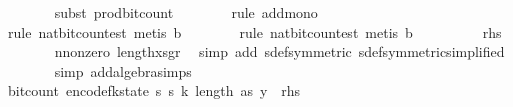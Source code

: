 \begin{isabellebody}
\ \ \ \ \ \ \isamarkupfalse%
\ {\isacharparenleft}{\kern0pt}subst\ prod{\isacharunderscore}{\kern0pt}bit{\isacharunderscore}{\kern0pt}count{\isacharunderscore}{\kern0pt}{}{\isacharparenright}{\kern0pt}\isanewline
\ \ \ \ \ \ \isamarkupfalse%
\ {\isacharparenleft}{\kern0pt}rule\ add{\isacharunderscore}{\kern0pt}mono{\isacharparenright}{\kern0pt}\isanewline
\ \ \ \ \ \ \isamarkupfalse%
\ {\isacharparenleft}{\kern0pt}rule\ nat{\isacharunderscore}{\kern0pt}bit{\isacharunderscore}{\kern0pt}count{\isacharunderscore}{\kern0pt}est{\isacharcomma}{\kern0pt}\ metis\ b{}{\isacharparenright}{\kern0pt}\isanewline
\ \ \ \ \ \ \isamarkupfalse%
\ {\isacharparenleft}{\kern0pt}rule\ nat{\isacharunderscore}{\kern0pt}bit{\isacharunderscore}{\kern0pt}count{\isacharunderscore}{\kern0pt}est{\isacharcomma}{\kern0pt}\ metis\ b{}{\isacharparenright}{\kern0pt}\isanewline
\ \ \ \ \isamarkupfalse%
\ \isamarkupfalse%
\ {\isachardoublequoteopen}{\isachardot}{\kern0pt}{\isachardot}{\kern0pt}{\isachardot}{\kern0pt}\ {\isasymle}\ {\isacharquery}{\kern0pt}rhs{\isachardoublequoteclose}\isanewline
\ \ \ \ \ \ \isamarkupfalse%
\ n{\isacharunderscore}{\kern0pt}nonzero\ length{\isacharunderscore}{\kern0pt}xs{\isacharunderscore}{\kern0pt}gr{\isacharunderscore}{\kern0pt}{}\ \isamarkupfalse%
\ {\isacharparenleft}{\kern0pt}simp\ add{\isacharcolon}{\kern0pt}\ sdef{\isacharbrackleft}{\kern0pt}symmetric{\isacharbrackright}{\kern0pt}\ sdef{\isacharbrackleft}{\kern0pt}symmetric{\isacharcomma}{\kern0pt}simplified{\isacharbrackright}{\kern0pt}{\isacharparenright}{\kern0pt}\isanewline
\ \ \ \ \ \ \isamarkupfalse%
\ {\isacharparenleft}{\kern0pt}simp\ add{\isacharcolon}{\kern0pt}algebra{\isacharunderscore}{\kern0pt}simps{\isacharparenright}{\kern0pt}\isanewline
\ \ \ \ \isamarkupfalse%
\ \isamarkupfalse%
\ {\isachardoublequoteopen}bit{\isacharunderscore}{\kern0pt}count\ {\isacharparenleft}{\kern0pt}encode{\isacharunderscore}{\kern0pt}fk{\isacharunderscore}{\kern0pt}state\ {\isacharparenleft}{\kern0pt}s\ s\ k{\isacharcomma}{\kern0pt}\ length\ as{\isacharcomma}{\kern0pt}\ y{\isacharparenright}{\kern0pt}{\isacharparenright}{\kern0pt}\ {\isasymle}\ {\isacharquery}{\kern0pt}rhs{\isachardoublequoteclose}\isanewline

\end{isabellebody}
